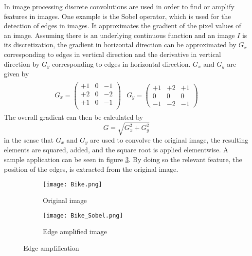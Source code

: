 In image processing discrete convolutions are used in order to find or amplify features in images. One example is the Sobel operator, which is used for the detection of edges in images. It approximates the gradient of the pixel values of an image. Assuming there is an underlying continuous function and an image $I$ is its discretization, the gradient in horizontal direction can be approximated by $G_x$ corresponding to edges in vertical direction and the derivative in vertical direction by $G_y$ corresponding to edges in horizontal direction. $G_x$ and $G_y$ are given by
\begin{align}
  \begin{split}
G_x =
\begin{pmatrix}
+1 & 0 & -1 \\
+2 & 0 & -2 \\
+1 & 0 & -1 \\
\end{pmatrix}
\end{split}
\begin{split}
G_y = 
\begin{pmatrix}
+1 & +2 & +1 \\
0 & 0 & 0 \\
-1 & -2 & -1
\end{pmatrix}
\end{split}
\end{align}
The overall gradient can then be calculated by
\begin{equation}
G = \sqrt{G_x^2+G_y^2}
\end{equation}
in the sense that $G_x$ and $G_y$ are used to convolve the original image, the resulting elements are squared, added, and the square root is applied elementwise. A sample application can be seen in figure \ref{fig:Sobel}. By doing so the relevant feature, the position of the edges, is extracted from the original image. \\
\begin{figure}
\centering
\begin{subfigure}{.5\textwidth}
  \centering
  \texttt{[image: Bike.png]}
  \caption{Original image}
  \label{fig:sub1}
\end{subfigure}%
\begin{subfigure}{.5\textwidth}
  \centering
  \texttt{[image: Bike\_Sobel.png]}
  \caption{Edge amplified image}
  \label{fig:sub2}
\end{subfigure}
\caption{Edge amplification}
\label{fig:Sobel}
\end{figure}

